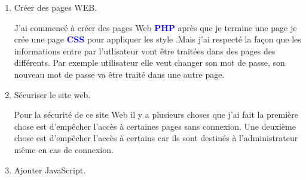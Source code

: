 \documentclass{article}
\begin{document}
\begin{enumerate}
\begin{enumerate}
         \item \textcolor{amethyst}{Créer des pages WEB}.
         
         \vspace{0.4cm}
                \setlength{\parindent}{1cm} J'ai commencé à créer des pages Web \textcolor{blue}{\textbf{PHP}} après que je termine une page je crée une page \textcolor{blue}{\textbf{CSS}} pour appliquer les style .Mais j'ai respecté la façon que les informations entre par l'utlisateur vont  être traitées dans des pages des différents. Par exemple utilisateur elle veut changer son mot de passe, son nouveau mot de passe va être traité dans une autre page.
         
         \hspace*{-1.05in}
               \noindent{}
         \item \textcolor{amethyst}{Sécuriser le site web}.
         
         \vspace{0.4cm}
                \setlength{\parindent}{1cm} Pour la sécurité de ce site Web il y a plusieurs choses que j'ai fait la première chose est d'empêcher l'accès à certaines pages sans connexion. Une deuxième chose est d'empêcher l'accès à certains car ils sont destinés à l'administrateur même en cas de connexion.
         
         \item \textcolor{amethyst}{Ajouter JavaScript}.
         

\end{enumerate}
\end{enumerate}
\end{document}

